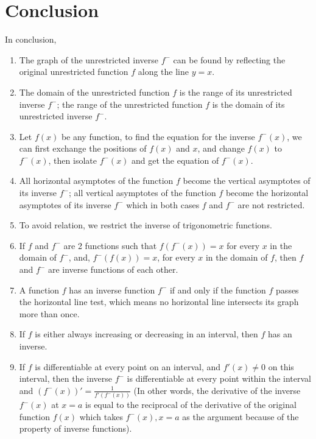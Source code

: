 \documentclass[12pt, titlepage]{article}
\begin{document}
    \section{Conclusion}
    In conclusion, 
    \begin{enumerate}
        \item The graph of the unrestricted inverse $f^-$ can be found by reflecting the original unrestricted function $f$ along the line $y=x$.
        \item The domain of the unrestricted function $f$ is the range of its unrestricted inverse $f^-$; the range of the unrestricted function $f$ is the domain of its unrestricted inverse $f^-$.
        \item Let $f(x)$ be any function, to find the equation for the inverse $f^-(x)$, we can first exchange the positions of $f(x)$ and $x$, and change $f(x)$ to $f^-(x)$, then isolate $f^-(x)$ and get the equation of $f^-(x)$.
        \item All horizontal asymptotes of the function $f$ become the vertical asymptotes of its inverse $f^-$;  all vertical asymptotes of the function $f$ become the horizontal asymptotes of its inverse $f^-$ which in both cases $f$ and $f^-$ are not restricted.
        \item To avoid relation, we restrict the inverse of trigonometric functions.
        \item If $f$ and $f^-$ are 2 functions such that $f(f^-(x)) = x$ for every $x$ in the domain of $f^-$, and, $f^-(f(x)) = x$, for every $x$ in the domain of $f$, then $f$ and $f^-$ are inverse functions of each other. 
        \item A function $f$ has an inverse function $f^-$ if and only if the function $f$ passes the horizontal line test, which means no horizontal line intersects its graph more than once.
        \item If $f$ is either always increasing or decreasing in an interval, then $f$ has an inverse.
        \item If $f$ is differentiable at every point on an interval, and $f'(x)\neq0$ on this interval, then the inverse $f^-$ is differentiable at every point within the interval and $(f^-(x))'=\frac{1}{f'(f^-(x))}$ (In other words, the derivative of the inverse $f^-(x)$ at $x=a$ is equal to the reciprocal of the derivative of the original function $f(x)$ which takes $f^-(x), x=a$ as the argument because of the property of inverse functions).
    \end{enumerate}
\end{document}
